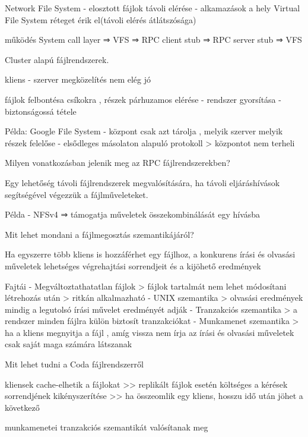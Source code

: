 \documentclass[12pt]{article}
\begin{document}
\begin{description}
    \item Network File System
        - elosztott fájlok távoli elérése
        - alkamazások a hely Virtual File System réteget érik el(távoli elérés átlátszósága)
    \item működés
        System call layer ⇒ VFS ⇒ RPC client stub ⇒ RPC server stub ⇒ VFS 
    \item  Cluster alapú fájlrendszerek.  
    \item kliens - szerver megközelítés nem elég jó 
    \item fájlok felbontésa csíkokra , részek párhuzamos elérése
        - rendszer gyorsítása
        - biztonságossá tétele
    \item Példa: Google File System
        - központ csak azt tárolja , melyik szerver melyik részek felelőse
        - elsődleges másolaton alapuló protokoll
        > központot nem terheli
    \item  Milyen vonatkozásban jelenik meg az RPC fájlrendszerekben?
    \item Egy lehetőség távoli fájlrendszerek megvalósítására, ha távoli eljáráshívások segítségével végezzük a fájlműveleteket.
    \item Példa
        - NFSv4 ⇒ támogatja műveletek összekombinálását egy hívásba
    \item  Mit lehet mondani a fájlmegosztás szemantikájáról?  
    \item Ha egyszerre több kliens is hozzáférhet egy fájlhoz, a konkurens írási és olvasási műveletek lehetséges végrehajtási sorrendjeit és a kijöhető eredmények
    \item Fajtái
        - Megváltoztathatatlan fájlok
        > fájlok tartalmát nem lehet módosítani létrehozás után
        > ritkán alkalmazható
        - UNIX szemantika
        > olvasási eredmények mindig a legutolsó írási művelet eredményét adják
        - Tranzakciós szemantika
        > a rendszer minden fájlra külön biztosít tranzakciókat
        - Munkamenet szemantika
        > ha a kliens megnyitja a fájl , amíg vissza nem írja az írási és olvasási műveletek csak saját maga számára látszanak
    \item  Mit lehet tudni a Coda fájlrendszerről 
    \item kliensek cache-elhetik a fájlokat
        >> replikált fájlok esetén költséges a kérések sorrendjének kikényszerítése
        >> ha összeomlik egy kliens, hosszu idő után jöhet a következő
    \item munkamenetei tranzakciós szemantikát valósítanak meg

\end{description}
\end{document}
